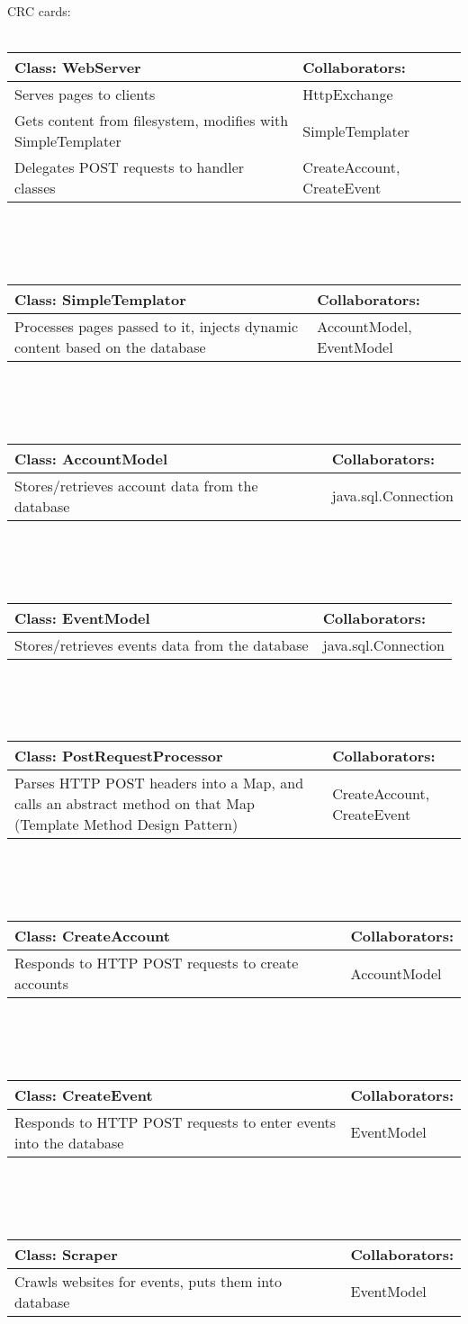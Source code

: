 \documentclass[10pt]{article}
\begin{document}
CRC cards:\\\\
\newcommand{\crccard}[2]{\begin{tabular}{|p{7cm}|p{5cm}|}\hline Class: #1 & Collaborators:\\\hline#2\hline\end{tabular}\\\\\\}
\crccard{WebServer}{
Serves pages to clients & HttpExchange\\
Gets content from filesystem, modifies with SimpleTemplater & SimpleTemplater\\
Delegates POST requests to handler classes & CreateAccount, CreateEvent\\
}
\crccard{SimpleTemplator}{
Processes pages passed to it, injects dynamic content based on the database & AccountModel, EventModel\\
}
\crccard{AccountModel}{
Stores/retrieves account data from the database & java.sql.Connection\\
}
\crccard{EventModel}{
Stores/retrieves events data from the database & java.sql.Connection\\
}
\crccard{PostRequestProcessor}{
Parses HTTP POST headers into a Map, and calls an abstract method on that Map (Template Method Design Pattern) & CreateAccount, CreateEvent\\
}
\crccard{CreateAccount}{
Responds to HTTP POST requests to create accounts & AccountModel\\
}
\crccard{CreateEvent}{
Responds to HTTP POST requests to enter events into the database & EventModel\\
}
\crccard{Scraper}{
Crawls websites for events, puts them into database & EventModel\\
}
\end{document}
